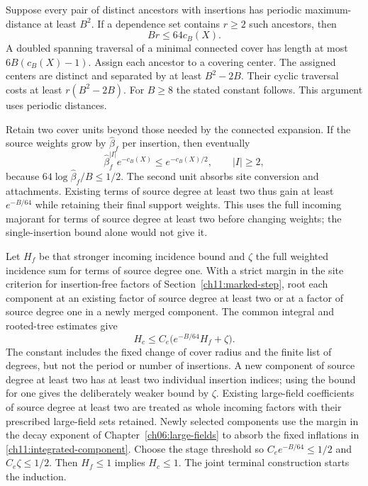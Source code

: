 Suppose every pair of distinct ancestors with insertions has periodic
maximum-distance at least $B^2$. If a dependence set contains $r\ge2$
such ancestors, then
\begin{equation}
 Br\le64c_B(X).
 \label{ch11:separated-cover}
\end{equation}
A doubled spanning traversal of a minimal connected cover has length
at most $6B(c_B(X)-1)$. Assign each ancestor to a covering center.
The assigned centers are distinct and separated by at least $B^2-2B$.
Their cyclic traversal costs at least $r(B^2-2B)$. For $B\ge8$
the stated constant follows. This argument uses periodic distances.

Retain two cover units beyond those needed by the connected expansion.
If the source weights grow by $\widehat\beta_f$ per insertion, then eventually
\[
 \widehat\beta_f^{|I|}e^{-c_B(X)}
       \le e^{-c_B(X)/2},\qquad |I|\ge2,
\]
because $64\log\widehat\beta_f/B\le1/2$.
The second unit absorbs site conversion and attachments. Existing terms of source degree at least two thus gain at least $e^{-B/64}$ while retaining their final support
weights. This uses the full incoming majorant for terms of source degree at least two before
changing weights; the single-insertion bound alone would not give it.

Let $H_f$ be that stronger incoming incidence bound and $\zeta$ the
full weighted incidence sum for terms of source degree one. With a strict margin in the
site criterion for insertion-free factors of Section~\ref{ch11:marked-step}, root each
component at an existing factor of source degree at least two or at a factor of source degree one
in a newly merged component. The common integral and rooted-tree estimates give
\begin{equation}
 H_c\le C_e\bigl(e^{-B/64}H_f+\zeta\bigr).
 \label{ch11:higher-induction}
\end{equation}
The constant includes the fixed change of cover radius and the finite list
of degrees, but not the period or number of insertions.
A new component of source degree at least two has at least two individual insertion indices; using the bound for
one gives the deliberately weaker bound by $\zeta$.
Existing large-field coefficients of source degree at least two are treated as whole incoming factors
with their prescribed large-field sets retained. Newly selected components use the
margin in the decay exponent of Chapter~\ref{ch06:large-fields} to absorb the fixed
inflations in \eqref{ch11:integrated-component}.
Choose the stage threshold so $C_e e^{-B/64}\le1/2$ and
$C_e\zeta\le1/2$. Then $H_f\le1$ implies $H_c\le1$.
The joint terminal construction starts the induction.

